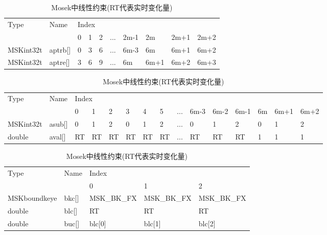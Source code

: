 \begin{table}[htbp]
  \caption{Mosek中线性约束(RT代表实时变化量)}
  \centering
  \begin{tabular}{@{}llllllllll@{}}
  \toprule
  \multirow{2}{*}{Type} & \multirow{2}{*}{Name} & \multicolumn{8}{l}{Index}   \\ \cmidrule(l){3-10} 
                        &    & 0  & 1  & 2   & ... & 2m-1  & 2m   & 2m+1 & 2m+2 \\ \cmidrule(r){1-2}
  MSKint32t & aptrb{[}{]}  & 0   & 3         & 6         & ... & 6m-3      & 6m   & 6m+1 & 6m+2 \\
  MSKint32t & aptre{[}{]}  & 3   & 6         & 9         & ... & 6m        & 6m+1 & 6m+2 & 6m+3 \\
 \bottomrule
  \end{tabular}

  \begin{tabular}{@{}lllllllllllllll@{}}
  \toprule
  \multirow{2}{*}{Type} & \multirow{2}{*}{Name} & \multicolumn{13}{l}{Index}    \\ \cmidrule(l){3-15} 
  &   & 0  & 1  & 2  & 3  & 4  & 5  & ... & 6m-3 & 6m-2 & 6m-1 & 6m & 6m+1 & 6m+2 \\ \cmidrule(r){1-2}
  MSKint32t  & asub{[}{]}   & 0  & 1  & 2  & 0  & 1  & 2  & ... & 0    & 1    & 2    & 0  & 1    & 2    \\
  double     & aval{[}{]}   & RT & RT & RT & RT & RT & RT & ... & RT   & RT   & RT   & 1  & 1    & 1    \\ \bottomrule
  \end{tabular}

  \begin{tabular}{@{}lllll@{}}
  \toprule
  \multirow{2}{*}{Type} & \multirow{2}{*}{Name} & \multicolumn{3}{l}{Index}      \\ \cmidrule(l){3-5} 
                        &               & 0           & 1           & 2           \\ \cmidrule(r){1-2}
  MSKboundkeye          & bkc{[}{]}             & MSK\_BK\_FX & MSK\_BK\_FX & MSK\_BK\_FX \\
  double                & blc{[}{]}             & RT          & RT          & RT          \\
  double                & buc{[}{]}             & blc{[}0{]}  & blc{[}1{]}  & blc{[}2{]}  \\ \bottomrule
  \end{tabular}

  \label{tab:moseklinearconstraint}
\end{table}

